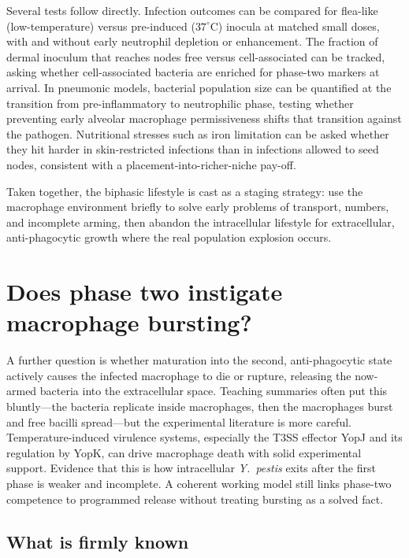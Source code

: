 \documentclass[11pt,a4paper]{article}
\begin{document}
Several tests follow directly. Infection outcomes can be compared for flea-like (low-temperature) versus pre-induced ($37^\circ\mathrm{C}$) inocula at matched small doses, with and without early neutrophil depletion or enhancement. The fraction of dermal inoculum that reaches nodes free versus cell-associated can be tracked, asking whether cell-associated bacteria are enriched for phase-two markers at arrival. In pneumonic models, bacterial population size can be quantified at the transition from pre-inflammatory to neutrophilic phase, testing whether preventing early alveolar macrophage permissiveness shifts that transition against the pathogen. Nutritional stresses such as iron limitation can be asked whether they hit harder in skin-restricted infections than in infections allowed to seed nodes, consistent with a placement-into-richer-niche pay-off.

Taken together, the biphasic lifestyle is cast as a staging strategy: use the macrophage environment briefly to solve early problems of transport, numbers, and incomplete arming, then abandon the intracellular lifestyle for extracellular, anti-phagocytic growth where the real population explosion occurs.

\section{Does phase two instigate macrophage bursting?}

A further question is whether maturation into the second, anti-phagocytic state actively causes the infected macrophage to die or rupture, releasing the now-armed bacteria into the extracellular space. Teaching summaries often put this bluntly---the bacteria replicate inside macrophages, then the macrophages burst and free bacilli spread---but the experimental literature is more careful. Temperature-induced virulence systems, especially the T3SS effector YopJ and its regulation by YopK, can drive macrophage death with solid experimental support. Evidence that this is how intracellular \textit{Y.\ pestis} exits after the first phase is weaker and incomplete. A coherent working model still links phase-two competence to programmed release without treating bursting as a solved fact.

\subsection{What is firmly known}
\end{document}
